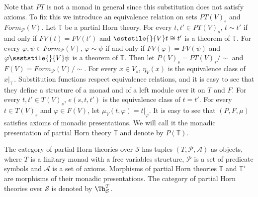 Note that $PT$ is not a monad in general since this substitution does not satisfy axioms.
To fix this we introduce an equivalence relation on sets $PT(V)_s$ and $Form_\mathcal{P}(V)$.
Let $\mathbb{T}$ be a partial Horn theory.
For every $t, t' \in PT(V)_s$, $t \sim t'$ if and only if $FV(t) = FV(t')$ and $\sststile{}{V} t \cong t'$ is a theorem of $\mathbb{T}$.
For every $\varphi, \psi \in Form_\mathcal{P}(V)$, $\varphi \sim \psi$ if and only if $FV(\varphi) = FV(\psi)$ and $\varphi \ssststile{}{V} \psi$ is a theorem of $\mathbb{T}$.
Then let $P(V)_s = PT(V)_s/\!\!\sim$ and $F(V) = Form_\mathcal{P}(V)/\!\!\sim$.
For every $x \in V_s$, $\eta_V(x)$ is the equivalence class of $x|_\top$.
Substitution functions respect equivalence relations, and it is easy to see that they define a structure of a monad and of a left module over it on $T$ and $F$.
For every $t,t' \in T(V)_s$, $e(s,t,t')$ is the equivalence class of $t = t'$.
For every $t \in T(V)_s$ and $\varphi \in F(V)$, let $\mu_V(t,\varphi) = t|_\varphi$.
It is easy to see that $(P,F,\mu)$ satisfies axioms of monadic presentations.
We will call it the monadic presentation of partial Horn theory $\mathbb{T}$ and denote by $P(\mathbb{T})$.

The category of partial Horn theories over $\mathcal{S}$ has tuples $(T,\mathcal{P},\mathcal{A})$ as objects,
    where $T$ is a finitary monad with a free variables structure, $\mathcal{P}$ is a set of predicate symbols and $\mathcal{A}$ is a set of axioms.
Morphisms of partial Horn theories $\mathbb{T}$ and $\mathbb{T}'$ are morphisms of their monadic presentations.
The category of partial Horn theories over $\mathcal{S}$ is denoted by $\Th^T_\mathcal{S}$.

